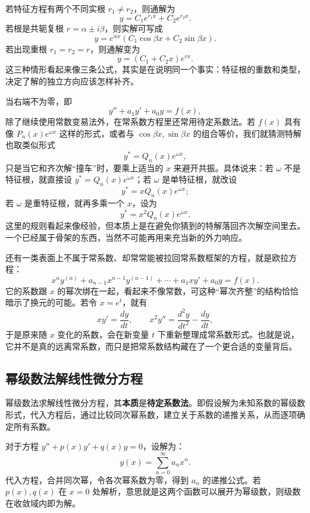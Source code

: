 \documentclass[UTF8]{ctexbook}
\begin{document}
若特征方程有两个不同实根 $r_1\ne r_2$，则通解为
\[
y=C_1e^{r_1x}+C_2e^{r_2x}.
\]
若根是共轭复根 $r=\alpha\pm i\beta$，则实解可写成
\[
y=e^{\alpha x}(C_1\cos\beta x+C_2\sin\beta x).
\]
若出现重根 $r_1=r_2=r$，则通解变为
\[
y=(C_1+C_2x)e^{rx}.
\]
这三种情形看起来像三条公式，其实是在说明同一个事实：特征根的重数和类型，决定了解的独立方向应该怎样补齐。

当右端不为零，即
\[
y''+a_1y'+a_0y=f(x),
\]
除了继续使用常数变易法外，在常系数方程里还常用待定系数法。若 $f(x)$ 具有像 $P_n(x)e^{\omega x}$ 这样的形式，或者与 $\cos\beta x,\sin\beta x$ 的组合等价，我们就猜测特解也取类似形式
\[
y^*=Q_n(x)e^{\omega x},
\]
只是当它和齐次解“撞车”时，要乘上适当的 $x$ 来避开共振。具体说来：若 $\omega$ 不是特征根，就直接设 $y^*=Q_n(x)e^{\omega x}$；若 $\omega$ 是单特征根，就改设
\[
y^*=xQ_n(x)e^{\omega x};
\]
若 $\omega$ 是重特征根，就再多乘一个 $x$，设为
\[
y^*=x^2Q_n(x)e^{\omega x}.
\]
这里的规则看起来像经验，但本质上是在避免你猜到的特解落回齐次解空间里去。一个已经属于骨架的东西，当然不可能再用来充当新的外力响应。

还有一类表面上不属于常系数、却常常能被拉回常系数框架的方程，就是欧拉方程：
\[
x^ny^{(n)}+a_{n-1}x^{n-1}y^{(n-1)}+\cdots+a_1xy'+a_0y=f(x).
\]
它的系数跟 $x$ 的幂次绑在一起，看起来不像常数，可这种“幂次齐整”的结构恰恰暗示了换元的可能。若令 $x=e^t$，就有
\[
xy'=\frac{dy}{dt},\qquad x^2y''=\frac{d^2y}{dt^2}-\frac{dy}{dt},
\]
于是原来随 $x$ 变化的系数，会在新变量 $t$ 下重新整理成常系数形式。也就是说，它并不是真的远离常系数，而只是把常系数结构藏在了一个更合适的变量背后。

\subsection{幂级数法解线性微分方程}

幂级数法求解线性微分方程，其\textbf{本质}是\textbf{待定系数法}。即假设解为未知系数的幂级数形式，代入方程后，通过比较同次幂系数，建立关于系数的递推关系，从而逐项确定所有系数。

对于方程 $y'' + p(x)y' + q(x)y = 0$，设解为：
\[
y(x) = \sum_{n=0}^{\infty} a_n x^n.
\]
代入方程，合并同次幂，令各次幂系数为零，得到 $a_n$ 的递推公式。若 $p(x), q(x)$ 在 $x=0$ 处解析，意思就是这两个函数可以展开为幂级数，则级数在收敛域内即为解。
\end{document}
